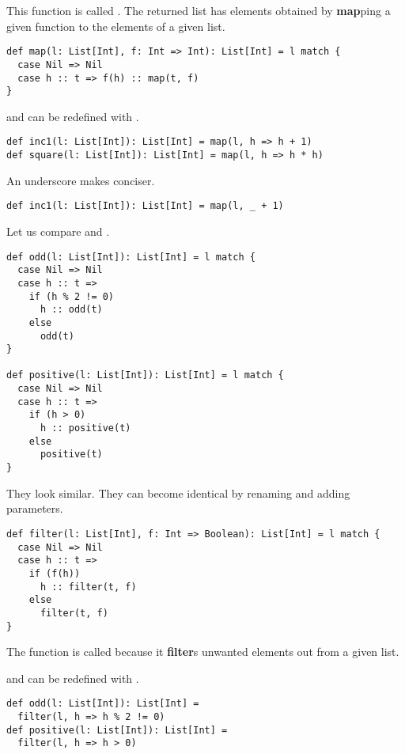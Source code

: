 This function is called . The returned list
has elements obtained by \textbf{map}ping a given function to the elements of a
given list.

\begin{verbatim}
def map(l: List[Int], f: Int => Int): List[Int] = l match {
  case Nil => Nil
  case h :: t => f(h) :: map(t, f)
}
\end{verbatim}

 and  can be redefined with .

\begin{verbatim}
def inc1(l: List[Int]): List[Int] = map(l, h => h + 1)
def square(l: List[Int]): List[Int] = map(l, h => h * h)
\end{verbatim}

An underscore makes  conciser.

\begin{verbatim}
def inc1(l: List[Int]): List[Int] = map(l, _ + 1)
\end{verbatim}

Let us compare  and .

\begin{verbatim}
def odd(l: List[Int]): List[Int] = l match {
  case Nil => Nil
  case h :: t =>
    if (h % 2 != 0)
      h :: odd(t)
    else
      odd(t)
}

def positive(l: List[Int]): List[Int] = l match {
  case Nil => Nil
  case h :: t =>
    if (h > 0)
      h :: positive(t)
    else
      positive(t)
}
\end{verbatim}

They look similar. They can become identical by renaming and adding parameters.

\begin{verbatim}
def filter(l: List[Int], f: Int => Boolean): List[Int] = l match {
  case Nil => Nil
  case h :: t =>
    if (f(h))
      h :: filter(t, f)
    else
      filter(t, f)
}
\end{verbatim}


The function is called  because it \textbf{filter}s
unwanted elements out from a given list.

 and  can be redefined with .

\begin{verbatim}
def odd(l: List[Int]): List[Int] =
  filter(l, h => h % 2 != 0)
def positive(l: List[Int]): List[Int] =
  filter(l, h => h > 0)
\end{verbatim}

